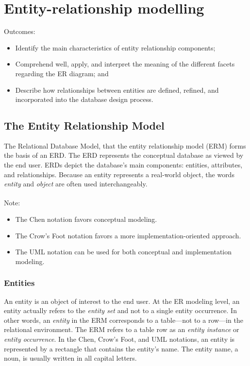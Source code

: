 \documentclass[a4paper, 12pt, titlepage]{report}
\begin{document}
{\chapter{Entity-relationship modelling}
Outcomes:
\begin{itemize}
\item Identify the main characteristics of entity relationship components;
\item Comprehend well, apply, and interpret the meaning of the different facets regarding the ER diagram; and
\item Describe how relationships between entities are defined, refined, and incorporated into the database design process.
\end{itemize}

\section{The Entity Relationship Model}
The Relational Database Model,
that the entity relationship model (ERM) forms the basis of an ERD. The ERD represents the conceptual database as viewed by the end user. ERDs depict the database’s main components: entities, attributes, and relationships. Because an entity represents a real-world object, the words \emph{entity} and \emph{object} are often used interchangeably.\\
\\Note:
\begin{itemize}
\item The Chen notation favors conceptual modeling.
\item The Crow’s Foot notation favors a more implementation-oriented approach.
\item The UML notation can be used for both conceptual and implementation modeling.
\end{itemize}

\subsection{Entities}
An entity is an object of interest to the end user. At the ER modeling level, an entity actually refers to the \emph{entity set} and not to a single entity occurrence. In other words, an \emph{entity} in the ERM corresponds to a table—not to a row—in the relational environment. The ERM refers to a table row as an \emph{entity instance} or \emph{entity occurrence}. In the Chen, Crow’s Foot, and UML notations, an entity is represented by a rectangle that contains the entity’s name. The entity name, a noun, is usually written in all capital letters.

}
\end{document}
